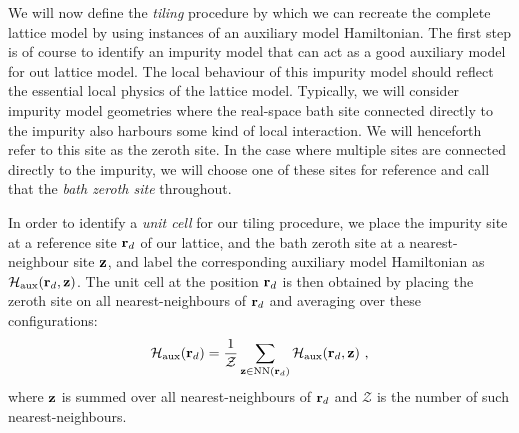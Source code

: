\documentclass[reprint,hidelinks,onecolumn]{revtex4-2}
\begin{document}
We will now define the {\it tiling} procedure by which we can recreate the complete lattice model by using instances of an auxiliary model Hamiltonian. The first step is of course to identify an impurity model that can act as a good auxiliary model for out lattice model. The local behaviour of this impurity model should reflect the essential local physics of the lattice model. Typically, we will consider impurity model geometries where the real-space bath site connected directly to the impurity also harbours some kind of local interaction. We will henceforth refer to this site as the zeroth site. In the case where multiple sites are connected directly to the impurity, we will choose one of these sites for reference and call that the {\it bath zeroth site} throughout.

In order to identify a {\it unit cell} for our tiling procedure, we place the impurity site at a reference site \({\bf r}_d\) of our lattice, and the bath zeroth site at a nearest-neighbour site \({\bf z}\), and label the corresponding auxiliary model Hamiltonian as \(\mathcal{H}_\text{aux}({\bf r}_d, {\bf z})\). The unit cell at the position \({\bf r}_d\) is then obtained by placing the zeroth site on all nearest-neighbours of \({\bf r}_d\) and averaging over these configurations:
\begin{equation}\begin{aligned}\label{unitCellHamiltonian}
	\mathcal{H}_\text{aux}({\bf r}_d) = \frac{1}{\mathcal{Z}}\sum_{{\bf z}\in\text{NN}({\bf r}_d)}\mathcal{H}_\text{aux}({\bf r}_d, {\bf z})~,
\end{aligned}\end{equation}
where \({\bf z}\) is summed over all nearest-neighbours of \({\bf r}_d\) and \(\mathcal{Z}\) is the number of such nearest-neighbours.
\end{document}
